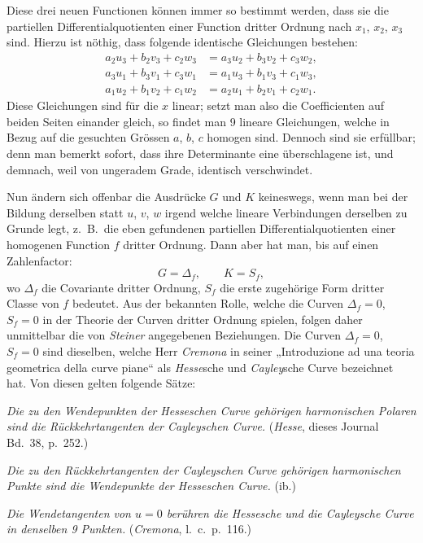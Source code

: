 \documentclass{article}
\begin{document}

Diese drei neuen Functionen können immer so bestimmt werden, dass sie die partiellen Differentialquotienten einer Function dritter Ordnung nach $x_{1}$, $x_{2}$, $x_{3}$ sind. Hierzu ist nöthig, dass folgende identische Gleichungen bestehen:
\[
\begin{aligned}
a_{2} u_{3}+b_{2} v_{3}+c_{2} w_{3} &= a_{3} u_{2}+b_{3} v_{2}+c_{3} w_{2},\\
a_{3} u_{1}+b_{3} v_{1}+c_{3} w_{1} &= a_{1} u_{3}+b_{1} v_{3}+c_{1} w_{3},\\
a_{1} u_{2}+b_{1} v_{2}+c_{1} w_{2} &= a_{2} u_{1}+b_{2} v_{1}+c_{2} w_{1}.
\end{aligned}
\]
Diese Gleichungen sind für die $x$ linear; setzt man also die Coefficienten auf beiden Seiten einander gleich, so findet man 9 lineare Gleichungen, welche in Bezug auf die gesuchten Grössen $a$, $b$, $c$ homogen sind. Dennoch sind sie erfüllbar; denn man bemerkt sofort, dass ihre Determinante eine überschlagene ist, und demnach, weil von ungeradem Grade, identisch verschwindet.

Nun ändern sich offenbar die Ausdrücke $G$ und $K$ keineswegs, wenn man bei der Bildung derselben statt $u$, $v$, $w$ irgend welche lineare Verbindungen derselben zu Grunde legt, z.\ B.\ die eben gefundenen partiellen Differentialquotienten einer homogenen Function $f$ dritter Ordnung. Dann aber hat man, bis auf einen Zahlenfactor:
\[
G = \Delta_{f}, \qquad K = S_{f},
\]
wo $\Delta_{f}$ die Covariante dritter Ordnung, $S_{f}$ die erste zugehörige Form dritter Classe von $f$ bedeutet. Aus der bekannten Rolle, welche die Curven $\Delta_{f}=0$, $S_{f}=0$ in der Theorie der Curven dritter Ordnung spielen, folgen daher unmittelbar die von \emph{Steiner} angegebenen Beziehungen. Die Curven $\Delta_{f}=0$, $S_{f}=0$ sind dieselben, welche Herr \emph{Cremona} in seiner „Introduzione ad una teoria geometrica della curve piane“ als \emph{Hesse}sche und \emph{Cayley}sche Curve bezeichnet hat. Von diesen gelten folgende Sätze:

\emph{Die zu den Wendepunkten der Hesseschen Curve gehörigen harmonischen Polaren sind die Rückkehrtangenten der Cayleyschen Curve.} (\emph{Hesse}, dieses Journal Bd.\ 38, p.\ 252.)

\emph{Die zu den Rückkehrtangenten der Cayleyschen Curve gehörigen harmonischen Punkte sind die Wendepunkte der Hesseschen Curve.} (ib.)

\emph{Die Wendetangenten von $u=0$ berühren die Hessesche und die Cayleysche Curve in denselben 9 Punkten.} (\emph{Cremona}, l.\ c.\ p.\ 116.)
\end{document}
